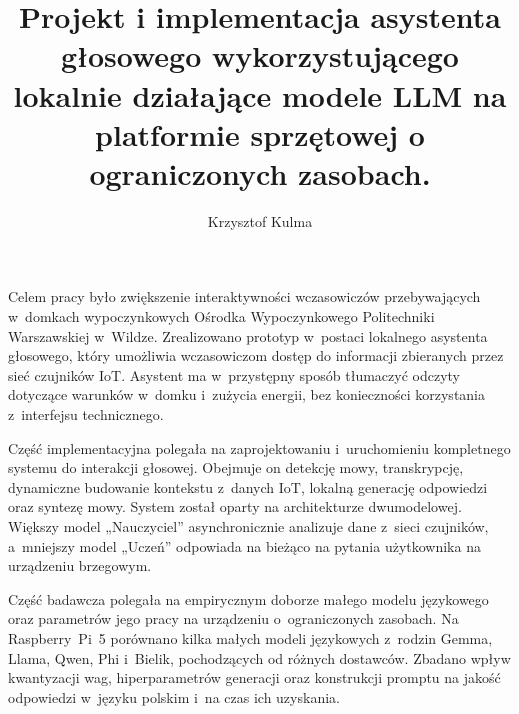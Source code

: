 \documentclass[
    a4paper,
    left=25mm,         %
    right=25mm,        %
    top=25mm,          %
    bottom=25mm,         %
    bindingoffset=5mm,  %
    nohyphenation=false %
]{src/wut-thesis}
\begin{document}
\MasterThesis %
{}
\title{
Projekt i implementacja asystenta głosowego wykorzystującego lokalnie działające modele LLM na platformie sprzętowej o ograniczonych zasobach.
}
\author{Krzysztof Kulma}
\date{\the\year}
\maketitle

\cleardoublepage %
\streszczenie Celem pracy było zwiększenie interaktywności wczasowiczów przebywających w~domkach wypoczynkowych Ośrodka Wypoczynkowego Politechniki Warszawskiej w~Wildze. Zrealizowano prototyp w~postaci lokalnego asystenta głosowego, który umożliwia wczasowiczom dostęp do informacji zbieranych przez sieć czujników IoT. Asystent ma w~przystępny sposób tłumaczyć odczyty dotyczące warunków w~domku i~zużycia energii, bez konieczności korzystania z~interfejsu technicznego.

Część implementacyjna polegała na zaprojektowaniu i~uruchomieniu kompletnego systemu do interakcji głosowej. Obejmuje on detekcję mowy, transkrypcję, dynamiczne budowanie kontekstu z~danych IoT, lokalną generację odpowiedzi oraz syntezę mowy. System został oparty na architekturze dwumodelowej. Większy model „Nauczyciel” asynchronicznie analizuje dane z~sieci czujników, a~mniejszy model „Uczeń” odpowiada na bieżąco na pytania użytkownika na urządzeniu brzegowym.

Część badawcza polegała na empirycznym doborze małego modelu językowego oraz parametrów jego pracy na urządzeniu o~ograniczonych zasobach. Na Raspberry~Pi~5 porównano kilka małych modeli językowych z~rodzin Gemma, Llama, Qwen, Phi i~Bielik, pochodzących od różnych dostawców. Zbadano wpływ kwantyzacji wag, hiperparametrów generacji oraz konstrukcji promptu na jakość odpowiedzi w~języku polskim i~na czas ich uzyskania.
\end{document}
